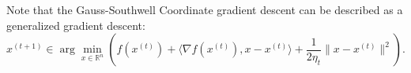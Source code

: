 \documentclass[openany]{book}
\newtheorem{theorem}{Theorem}[chapter]
\theoremstyle{definition}
\theoremstyle{remark}
\begin{document}
Note that the Gauss-Southwell Coordinate gradient descent can be described as a generalized gradient descent:
\begin{equation}
    x^{(t+1)}\in\arg\min_{x\in \mathbb{R}^n}\left(f(x^{(t)})+\langle\nabla f(x^{(t)}),x-x^{(t)}\rangle+\frac{1}{2\eta_t}\|x-x^{(t)}\|^2\right).
\end{equation}

\begin{comment}
Below we give some coordinate descent algorithms. Suppose $f$ is $\beta$-strongly smooth and convex, and for all $1\le i\le n$, all $x_{-i}\in \mathbb{R}^{n-1}$, $f(\cdot,x_{-i})$ is $\beta_i$-strongly smooth and convex. We have for all $1\le i\le n$, $\beta_i\le\beta\le \sum_{i=1}^{n}\beta_i$. Also let $\beta_{\mathrm{max}}=\max_{i=1}^{n}\beta_i$ and $\beta_{\mathrm{min}}=\min_{i=1}^{n}\beta_i$.

\section{Gauss-Southwell Block Coordinate Gradient Descent}
In this variation, at step $t$ we choose $i_t$ such that $i_t\in\arg\max_{1\le i\le n}|\nabla_if(x^{(t)})|$, and use $\frac{1}{\beta_{i_t}}$ as the step size. One then can prove the following key property:
\begin{equation}
    f(x^{(t)})-f^{(t+1)}\ge \frac{1}{2\beta_{i_t}}\|\nabla_{i_t}f(x^{(t)})\|_2^2\ge \frac{1}{2n\beta_{\mathrm{max}}}\|\nabla f(x^{(t)})\|_2^2.
\end{equation}
In other words, $n\beta$ can be seen as the smoothness parameter. Thus we can get the following result:
\begin{theorem}
    If $f$ is $\beta$-strongly smooth and convex, then
    \begin{equation}
        f(x^{(t)})-f(x^{\star})\le \frac{2n\beta_{\mathrm{max}}\|x^{(0)}-x^{\star}\|_2^2}{t}.
    \end{equation}
    If $f$ is further $\alpha$-strongly convex, then
    \begin{equation}
        f(x^{(t)})-f(x^{\star})\le(1-\frac{\alpha}{n\beta_{\mathrm{max}}})^t(f(x^{(0)})-f(x^{\star})).
    \end{equation}
\end{theorem}


\end{comment}
\end{document}
